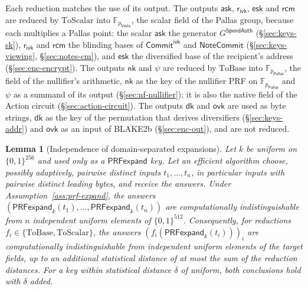 \documentclass[11pt,a4paper]{article}
\newtheorem{lemma}[theorem]{Lemma}
\theoremstyle{definition}
\newcommand{\F}{\mathbb{F}}
\newcommand{\Pallas}{\ensuremath{\mathsf{Pallas}}}
\newcommand{\Vesta}{\ensuremath{\mathsf{Vesta}}}
\newcommand{\NoteCommit}{\ensuremath{\mathsf{NoteCommit}}}
\newcommand{\CommitIvk}{\ensuremath{\mathsf{Commit}^{\mathsf{ivk}}}}
\newcommand{\ask}{\ensuremath{\mathsf{ask}}}
\newcommand{\nksym}{\ensuremath{\mathsf{nk}}}
\newcommand{\ovk}{\ensuremath{\mathsf{ovk}}}
\newcommand{\dk}{\ensuremath{\mathsf{dk}}}
\newcommand{\rcm}{\ensuremath{\mathsf{rcm}}}
\newcommand{\rivk}{\ensuremath{\mathsf{r_{ivk}}}}
\begin{document}
Each reduction matches the use of its output. The outputs $\ask$, $\rivk$,
$\mathsf{esk}$ and $\rcm$ are reduced by $\mathrm{ToScalar}$ into
$\F_{p_{\Vesta}}$, the scalar field of the Pallas group, because each
multiplies a Pallas point: the scalar $\ask$ the generator
$G^{\mathsf{SpendAuth}}$ (\S\ref{sec:keys-sk}), $\rivk$ and $\rcm$ the
blinding bases of $\CommitIvk$ and $\NoteCommit$ (\S\ref{sec:keys-viewing},
\S\ref{sec:notes-cm}), and $\mathsf{esk}$ the diversified base of the
recipient's address (\S\ref{sec:enc-encrypt}). The outputs $\nksym$ and
$\psi$ are reduced by $\mathrm{ToBase}$ into $\F_{p_{\Pallas}}$, the field
of the nullifier's arithmetic, $\nksym$ as the key of the nullifier PRF on
$\F_{p_{\Pallas}}$ and $\psi$ as a summand of its output
(\S\ref{sec:nf-nullifier}); it is also the native field of the Action
circuit (\S\ref{sec:action-circuit}). The outputs $\dk$ and $\ovk$ are used
as byte strings, $\dk$ as the key of the permutation that derives
diversifiers (\S\ref{sec:keys-addr}) and $\ovk$ as an input of BLAKE2b
(\S\ref{sec:enc-out}), and are not reduced.

\begin{lemma}[Independence of domain-separated expansions]%
\label{lem:prf-independence}
Let $k$ be uniform on $\{0,1\}^{256}$ and used only as a $\mathsf{PRFexpand}$
key. Let an efficient algorithm choose, possibly adaptively, pairwise
distinct inputs $t_1, \dots, t_n$, in particular inputs with pairwise
distinct leading bytes, and receive the answers. Under
Assumption~\ref{ass:prf-expand}, the answers
$(\mathsf{PRFexpand}_k(t_1), \dots, \mathsf{PRFexpand}_k(t_n))$ are
computationally indistinguishable from $n$ independent uniform elements of
$\{0,1\}^{512}$. Consequently, for reductions
$f_i \in \{\mathrm{ToBase}, \mathrm{ToScalar}\}$, the answers
$(f_i(\mathsf{PRFexpand}_k(t_i)))_i$ are computationally indistinguishable
from independent uniform elements of the target fields, up to an additional
statistical distance of at most the sum of the reduction distances. For a
key within statistical distance $\delta$ of uniform, both conclusions hold
with $\delta$ added.
\end{lemma}
\end{document}
